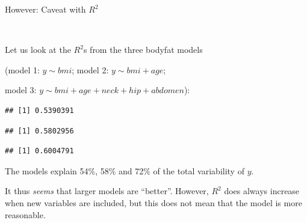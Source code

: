 \documentclass[10pt,ignorenonframetext,]{beamer}
\newenvironment{Shaded}{\begin{snugshade}}{\end{snugshade}}
\newcommand{\KeywordTok}[1]{\textcolor[rgb]{0.13,0.29,0.53}{\textbf{#1}}}
\newcommand{\OperatorTok}[1]{\textcolor[rgb]{0.81,0.36,0.00}{\textbf{#1}}}
\newcommand{\NormalTok}[1]{#1}
\begin{document}
\begin{frame}[fragile]

\begin{block}{However: Caveat with \(R^2\)}

\(~\)

Let us look at the \(R^2\)s from the three bodyfat models

(model 1: \(y\sim bmi\); model 2: \(y\sim bmi + age\);

model 3: \(y\sim bmi + age + neck + hip + abdomen\)):

\tiny

\begin{Shaded}
\end{Shaded}

\begin{verbatim}
## [1] 0.5390391
\end{verbatim}

\begin{Shaded}
\end{Shaded}

\begin{verbatim}
## [1] 0.5802956
\end{verbatim}

\begin{Shaded}
\end{Shaded}

\begin{verbatim}
## [1] 0.6004791
\end{verbatim}

\normalsize
The models explain 54\%, 58\% and 72\% of the total variability of
\(y\).

It thus \emph{seems} that larger models are ``better''. However, \(R^2\)
does always increase when new variables are included, but this does not
mean that the model is more reasonable.

\end{block}

\end{frame}
\end{document}
